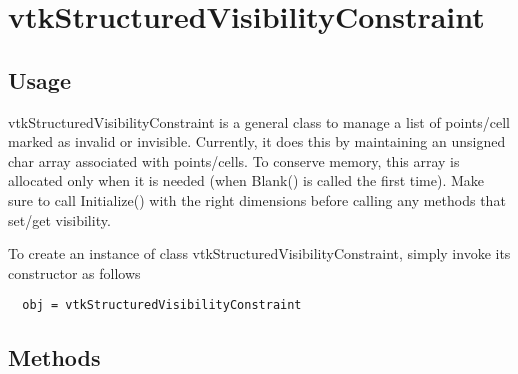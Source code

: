 \section{vtkStructuredVisibilityConstraint}

\subsection{Usage}

 vtkStructuredVisibilityConstraint is a general class to manage
 a list of points/cell marked as invalid or invisible. Currently,
 it does this by maintaining an unsigned char array associated
 with points/cells. To conserve memory, this array is allocated
 only when it is needed (when Blank() is called the first time).
 Make sure to call Initialize() with the right dimensions before
 calling any methods that set/get visibility.

To create an instance of class vtkStructuredVisibilityConstraint, simply
invoke its constructor as follows
\begin{verbatim}
  obj = vtkStructuredVisibilityConstraint
\end{verbatim}
\subsection{Methods}

